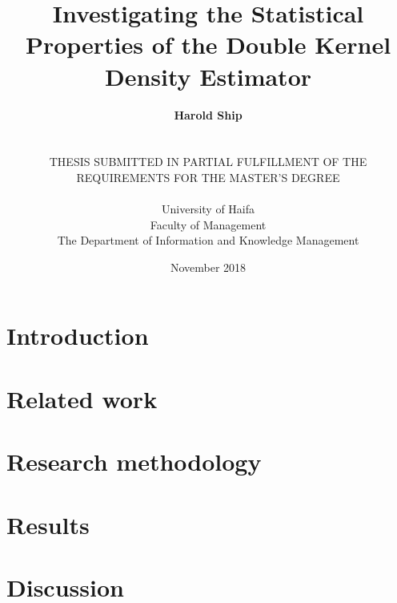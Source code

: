 \documentclass[a4paper,12pt,titlepage,twoside,openany]{book}
\title{
    \textbf{Investigating the Statistical Properties of the Double Kernel Density Estimator}
}
\author{
    \textbf{Harold Ship}\\%
    \\%
    \\%
    THESIS SUBMITTED IN PARTIAL FULFILLMENT OF THE\\%
    REQUIREMENTS FOR THE MASTER'S DEGREE\\%
    \\%
    University of Haifa\\%
    Faculty of Management\\%
    The Department of Information and Knowledge Management
}
\date{November 2018}
\begin{document}
\lstset{language=R}

\frontmatter                            %
\doublespacing
\maketitle                              %

\cleardoublepage


\cleardoublepage

%

\singlespacing                          %
\tableofcontents                        %
\cleardoublepage


\cleardoublepage

\listoftables
\cleardoublepage
\listoffigures
\printglossaries


\mainmatter                             %

\onehalfspacing
\chapter{Introduction}
\label{ch:introduction}


\chapter{Related work}
\label{ch:related}


\chapter{Research methodology}
\label{ch:method}


\chapter{Results}
\label{ch:results}


\chapter{Discussion}
\label{ch:discussion}

\end{document}
